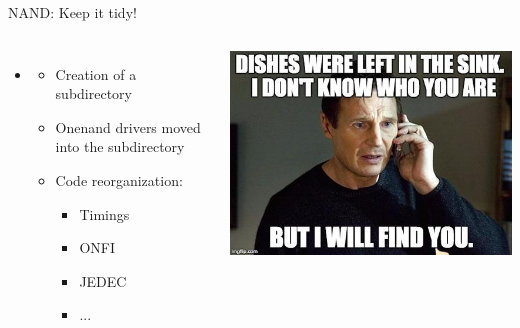 \documentclass[aspectratio=169,obeyspaces,spaces,hyphens,dvipsnames]{beamer}
\begin{document}
\begin{frame}{NAND: Keep it tidy!}
  \begin{columns}
    \begin{itemize}
    \item {}
      \begin{itemize}
      \item Creation of a  subdirectory
      \item Onenand drivers moved into the  subdirectory
      \item Code reorganization:
        \begin{itemize}
        \item Timings
        \item ONFI
        \item JEDEC
        \item ...
        \end{itemize}
      \end{itemize}
    \end{itemize}
    \begin{center}
      \includegraphics[scale=0.35]{dishes-in-sink-meme.jpg}
    \end{center}
  \end{columns}
\end{frame}
\end{document}
